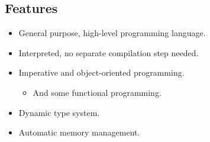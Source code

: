 \documentclass[aspectratio=1610,slidestop]{beamer}
\begin{document}
\subsection{Features}
\begin{pframe}
 \begin{itemize}
  \item General purpose, high-level programming language.
  \pause
  \item Interpreted, no separate compilation step needed.
  \pause
  \item Imperative and object-oriented programming.
  \begin{itemize}
   \item And some functional programming.
  \end{itemize}
  \pause
  \item Dynamic type system.
  \pause
  \item Automatic memory management.
 \end{itemize}
\end{pframe}
\end{document}
